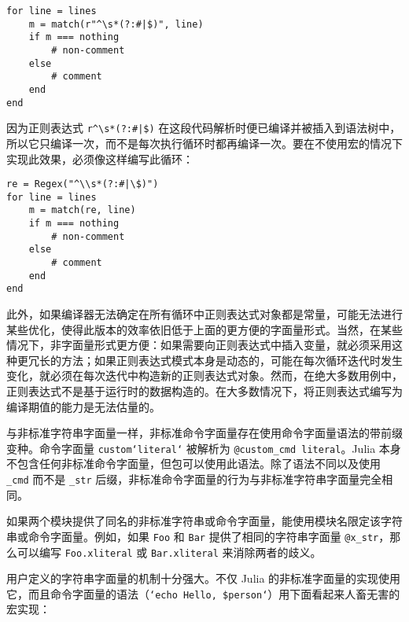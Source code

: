 \begin{verbatim}
for line = lines
    m = match(r"^\s*(?:#|$)", line)
    if m === nothing
        # non-comment
    else
        # comment
    end
end
\end{verbatim}



因为正则表达式 \texttt{r{\textquotedbl}{\textasciicircum}{\textbackslash}s*(?:\#|\$){\textquotedbl}} 在这段代码解析时便已编译并被插入到语法树中，所以它只编译一次，而不是每次执行循环时都再编译一次。要在不使用宏的情况下实现此效果，必须像这样编写此循环：




\begin{verbatim}
re = Regex("^\\s*(?:#|\$)")
for line = lines
    m = match(re, line)
    if m === nothing
        # non-comment
    else
        # comment
    end
end
\end{verbatim}



此外，如果编译器无法确定在所有循环中正则表达式对象都是常量，可能无法进行某些优化，使得此版本的效率依旧低于上面的更方便的字面量形式。当然，在某些情况下，非字面量形式更方便：如果需要向正则表达式中插入变量，就必须采用这种更冗长的方法；如果正则表达式模式本身是动态的，可能在每次循环迭代时发生变化，就必须在每次迭代中构造新的正则表达式对象。然而，在绝大多数用例中，正则表达式不是基于运行时的数据构造的。在大多数情况下，将正则表达式编写为编译期值的能力是无法估量的。



与非标准字符串字面量一样，非标准命令字面量存在使用命令字面量语法的带前缀变种。命令字面量 \texttt{custom`literal`} 被解析为 \texttt{@custom\_cmd {\textquotedbl}literal{\textquotedbl}}。Julia 本身不包含任何非标准命令字面量，但包可以使用此语法。除了语法不同以及使用 \texttt{\_cmd} 而不是 \texttt{\_str} 后缀，非标准命令字面量的行为与非标准字符串字面量完全相同。



如果两个模块提供了同名的非标准字符串或命令字面量，能使用模块名限定该字符串或命令字面量。例如，如果 \texttt{Foo} 和 \texttt{Bar} 提供了相同的字符串字面量 \texttt{@x\_str}，那么可以编写 \texttt{Foo.x{\textquotedbl}literal{\textquotedbl}} 或 \texttt{Bar.x{\textquotedbl}literal{\textquotedbl}} 来消除两者的歧义。



用户定义的字符串字面量的机制十分强大。不仅 Julia 的非标准字面量的实现使用它，而且命令字面量的语法（\texttt{`echo {\textquotedbl}Hello, \$person{\textquotedbl}`}）用下面看起来人畜无害的宏实现：




